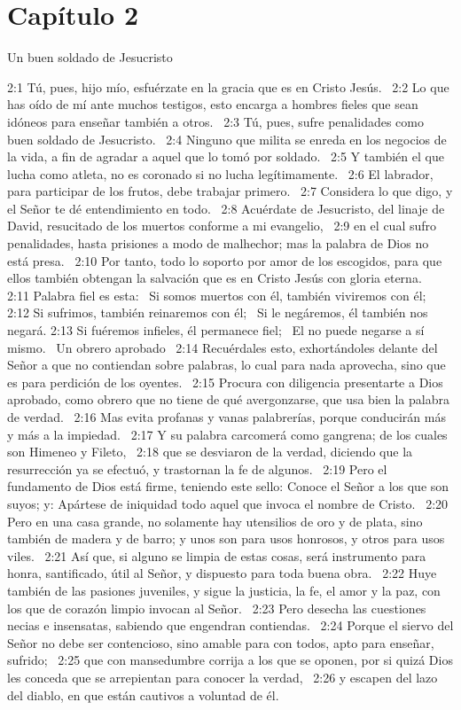 \section*{Capítulo 2}
Un buen soldado de Jesucristo  

2:1 Tú, pues, hijo mío, esfuérzate en la gracia que es en Cristo Jesús.  
2:2 Lo que has oído de mí ante muchos testigos, esto encarga a hombres fieles que sean idóneos para enseñar también a otros.  
2:3 Tú, pues, sufre penalidades como buen soldado de Jesucristo.  
2:4 Ninguno que milita se enreda en los negocios de la vida, a fin de agradar a aquel que lo tomó por soldado.  
2:5 Y también el que lucha como atleta, no es coronado si no lucha legítimamente.  
2:6 El labrador, para participar de los frutos, debe trabajar primero.  
2:7 Considera lo que digo, y el Señor te dé entendimiento en todo.  
2:8 Acuérdate de Jesucristo, del linaje de David, resucitado de los muertos conforme a mi evangelio,  
2:9 en el cual sufro penalidades, hasta prisiones a modo de malhechor; mas la palabra de Dios no está presa.  
2:10 Por tanto, todo lo soporto por amor de los escogidos, para que ellos también obtengan la salvación que es en Cristo Jesús con gloria eterna.  
2:11 Palabra fiel es esta:  
Si somos muertos con él, también viviremos con él;  
2:12 Si sufrimos, también reinaremos con él;  
Si le negáremos, él también nos negará. 
2:13 Si fuéremos infieles, él permanece fiel;  
El no puede negarse a sí mismo.  
Un obrero aprobado  
2:14 Recuérdales esto, exhortándoles delante del Señor a que no contiendan sobre palabras, lo cual para nada aprovecha, sino que es para perdición de los oyentes.  
2:15 Procura con diligencia presentarte a Dios aprobado, como obrero que no tiene de qué avergonzarse, que usa bien la palabra de verdad.  
2:16 Mas evita profanas y vanas palabrerías, porque conducirán más y más a la impiedad.  
2:17 Y su palabra carcomerá como gangrena; de los cuales son Himeneo y Fileto,  
2:18 que se desviaron de la verdad, diciendo que la resurrección ya se efectuó, y trastornan la fe de algunos.  
2:19 Pero el fundamento de Dios está firme, teniendo este sello: Conoce el Señor a los que son suyos; y: Apártese de iniquidad todo aquel que invoca el nombre de Cristo.  
2:20 Pero en una casa grande, no solamente hay utensilios de oro y de plata, sino también de madera y de barro; y unos son para usos honrosos, y otros para usos viles.  
2:21 Así que, si alguno se limpia de estas cosas, será instrumento para honra, santificado, útil al Señor, y dispuesto para toda buena obra.  
2:22 Huye también de las pasiones juveniles, y sigue la justicia, la fe, el amor y la paz, con los que de corazón limpio invocan al Señor.  
2:23 Pero desecha las cuestiones necias e insensatas, sabiendo que engendran contiendas.  
2:24 Porque el siervo del Señor no debe ser contencioso, sino amable para con todos, apto para enseñar, sufrido;  
2:25 que con mansedumbre corrija a los que se oponen, por si quizá Dios les conceda que se arrepientan para conocer la verdad,  
2:26 y escapen del lazo del diablo, en que están cautivos a voluntad de él.  
